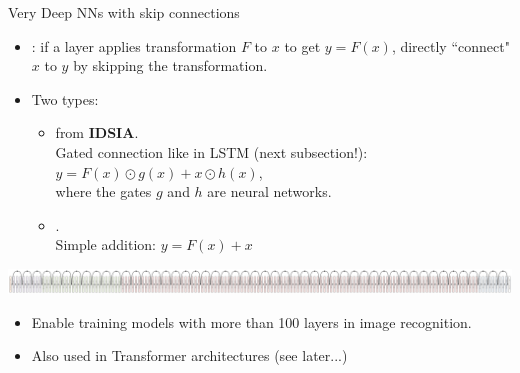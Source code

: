 \begin{frame}{Very Deep NNs with skip connections}
\begin{itemize}
\item {}:
if a layer applies transformation $F$ to $x$ to get $y = F(x)$,
directly ``connect" $x$ to $y$ by skipping the transformation.
\item Two types:
\begin{itemize}
\item  {}  from \textbf{IDSIA}.\\
Gated connection like in LSTM (next subsection!):\\
$y = F(x) \odot g(x)+ x \odot h(x) $, \\
where the gates $g$ and $h$ are neural networks.\\
\item {} . \\
Simple addition:
$y = F(x) + x $
\end{itemize}
\end{itemize}
\hspace{-10mm}
{\raggedleft
    \includegraphics[height=0.09\textheight]{figures/deep_net.png} \\
}
\begin{itemize}
\item Enable training models with more than 100 layers in image recognition.
\item Also used in Transformer architectures (see later...)
\end{itemize}
\end{frame}


